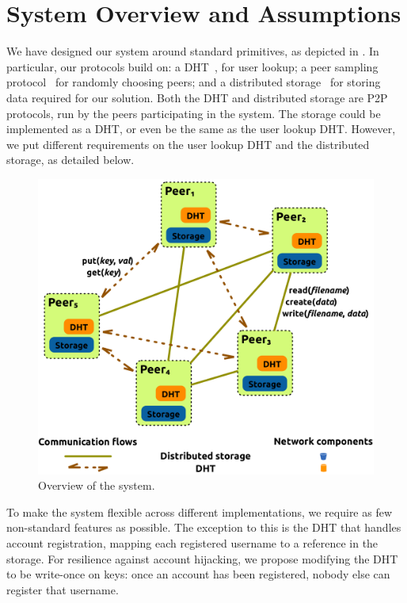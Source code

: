 \section{System Overview and Assumptions} 

We have designed our system around standard primitives, as
depicted in .  In particular, our protocols
build on: a DHT~\cite{WehrleGR05,JimenezOK11}, for user lookup; a peer sampling
protocol~\cite{JelasityVGKS07,BortnikovGKKS09} for randomly choosing peers; and a distributed
storage~\cite{BennettGHP02,RheaEGWZK03} for storing data required for our
solution. Both the DHT and distributed storage are P2P protocols, run by the
peers participating in the system. The storage could be implemented as a DHT,
or even be the same as the user lookup DHT. However, we put different
requirements on the user lookup DHT and the distributed storage, as detailed
below.

\begin{figure}
  \centering
  \includegraphics[width=.88\textwidth]{images/passwords-peer-to-peer/system-overview-fully-distributed}
  \caption{Overview of the system.}
\end{figure}

To make the system flexible across different implementations, we require as few non-standard features as
possible. The exception to this is the DHT that handles
account registration, mapping each registered username to a reference
in the storage.  For resilience against account hijacking,
we propose modifying the DHT to be write-once on keys:
once an account has been registered, nobody else can register that
username.

